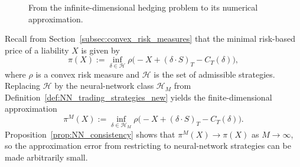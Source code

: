 \documentclass[12pt,a4paper]{article}
\theoremstyle{definition}
\theoremstyle{plain}
\theoremstyle{remark}
\theoremstyle{plain}
\begin{document}
\begin{figure}[!ht]
\centering
{}
\caption{From the infinite-dimensional hedging problem to its numerical approximation.}
\label{fig:nn_pipeline}
\end{figure}

\FloatBarrier

Recall from Section~\ref{subsec:convex_risk_measures} that the minimal risk-based price of a liability $X$ is given by
\begin{equation}
\pi(X)
:=
\inf_{\delta\in\mathcal H}
\rho\bigl(-X + (\delta\cdot S)_T - C_T(\delta)\bigr),
\label{eq:pi_again}
\end{equation}
where $\rho$ is a convex risk measure and $\mathcal H$ is the set of admissible strategies.
Replacing $\mathcal H$ by the neural-network class $\mathcal H_M$ from Definition~\ref{def:NN_trading_strategies_new} yields the finite-dimensional approximation
\begin{equation}
\pi^{M}(X)
:=
\inf_{\delta\in\mathcal H_M}
\rho\bigl(-X + (\delta\cdot S)_T - C_T(\delta)\bigr).
\label{eq:piM_NN_def}
\end{equation}
Proposition~\ref{prop:NN_consistency} shows that $\pi^{M}(X)\to\pi(X)$ as $M\to\infty$, so the approximation error from restricting to neural-network strategies can be made arbitrarily small.
\end{document}
